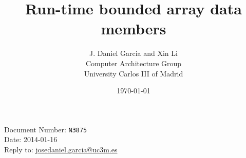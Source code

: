 \documentclass[10pt,a4paper,oneside,final,notitlepage]{article}%
\begin{document}
\begin{flushright}
Document Number: \texttt{N3875}\\
Date: 2014-01-16\\
Reply to: \url{josedaniel.garcia@uc3m.es}
\end{flushright}

\title{Run-time bounded array data members}
\author{J. Daniel Garcia and Xin Li\\
Computer Architecture Group\\
University Carlos III of Madrid
}
\date{\today}

\begingroup
\let\newpage\relax%
\maketitle
\endgroup







\end{document}
